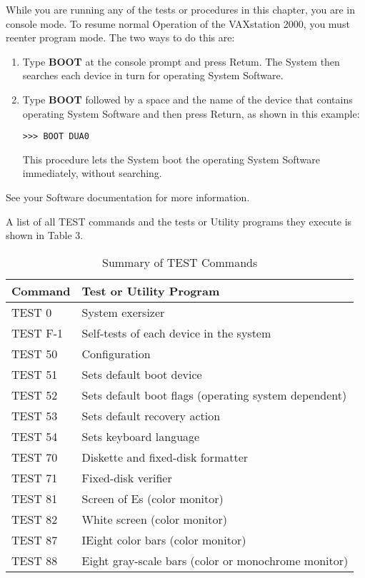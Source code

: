 \documentclass{dec}
\begin{document}

While you are running any of the tests or procedures in this chapter, you are
in console mode. To resume normal Operation of the VAXstation 2000, you
must reenter program mode. The two ways to do this are:

\begin{enumerate}
\item Type \textbf{BOOT} at the console prompt and press Retum. The System then
searches each device in turn for operating System Software.

\item Type \textbf{BOOT} followed by a space and the name of the device that
contains operating System Software and then press Return, as shown in
this example:

{\tt >>> BOOT DUA0}

This procedure lets the System boot the operating System Software immediately, without searching.

\end{enumerate}

See your Software documentation for more information.


A list of all TEST commands and the tests or Utility programs they execute
is shown in Table 3.

\begin{table}[H]
\caption{Summary of TEST Commands}
\label{table:3}
\begin{tabularx}{\textwidth}{l l}
\hline
\textbf{Command} & \textbf{Test or Utility Program}\\
\hline
TEST 0 & System exersizer \\
TEST F-1 & Self-tests of each device in the system \\
TEST 50 & Configuration \\
TEST 51 & Sets default boot device \\
TEST 52 & Sets default boot flags (operating system dependent) \\
TEST 53 & Sets default recovery action \\
TEST 54 & Sets keyboard language \\
TEST 70 & Diskette and fixed-disk formatter \\
TEST 71 & Fixed-disk verifier \\
TEST 81 & Screen of Es (color monitor) \\
TEST 82 & White screen (color monitor) \\
TEST 87 & IEight color bars (color monitor) \\
TEST 88 & Eight gray-scale bars (color or monochrome monitor) \\
\end{tabularx}
\end{table}


\howtoorder
\end{document}
